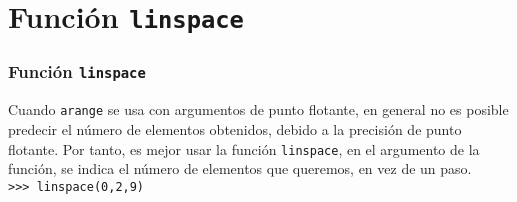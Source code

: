 \documentclass[12pt]{beamer}
\begin{document}
\section{Funci\'{o}n \texttt{linspace}}
\begin{frame}
\frametitle{Funci\'{o}n \texttt{linspace}}
Cuando \texttt{arange} se usa con argumentos de punto flotante, en general no es posible predecir el n\'{u}mero de elementos obtenidos, debido a la precisi\'{o}n de punto flotante. Por tanto, es mejor usar la funci\'{o}n \texttt{linspace}, en el argumento de la funci\'{o}n, se indica el n\'{u}mero de elementos que queremos, en vez de un paso.
\\
\bigskip
\texttt{>>> linspace(0,2,9)} \\
 \\
 \\
 \\
\end{frame}
\end{document}
